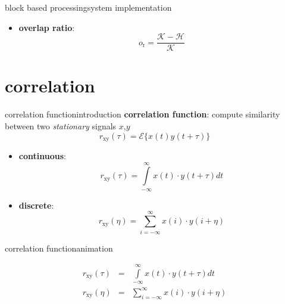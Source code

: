 \begin{frame}{block based processing}{system implementation}
{\begin{itemize}
\begin{eqnarray*}
                        i_{\mathrm{e}}(n)		&=& i_{\mathrm{s}}(n) + \mathcal{K} - 1
                    \end{eqnarray*}
                \item   \textbf{overlap ratio}:
                    \begin{equation*}
                        o_{\mathrm{r}}	= \frac {\mathcal{K}-\mathcal{H}}{\mathcal{K}}
                    \end{equation*}
            \end{itemize}}
            \vspace{50mm}
        \end{frame}	

    \section[correlation]{correlation}
        \begin{frame}{correlation function}{introduction}
            \textbf{correlation function}: compute similarity between two \textit{stationary} signals $x$,$y$
            \begin{equation}
                r_\mathrm{xy}(\tau)=\mathcal{E}\lbrace x(t)y(t+\tau)\rbrace  
            \end{equation}  
            
            \begin{itemize}
                \item<2->	\textbf{continuous}:
                    \begin{equation*}
                        r_\mathrm{xy}(\tau) = \int\limits_{-\infty}^{\infty}{x(t)\cdot y(t+\tau)dt}
                    \end{equation*}
                \item<2->	\textbf{discrete}:
                    \begin{equation*}
                        r_\mathrm{xy}(\eta) = \sum\limits_{i=-\infty}^{\infty}{x(i)\cdot y(i+\eta)}
                    \end{equation*}
            \end{itemize}
        \end{frame}	

        \begin{frame}{correlation function}{animation}
            \vspace{-5mm}
            \begin{footnotesize}
                    \begin{eqnarray*}
                        r_\mathrm{xy}(\tau) &=& \int\limits_{-\infty}^{\infty}{x(t)\cdot y(t+\tau)dt}\\
                        r_\mathrm{xy}(\eta) &=& \sum\limits_{i=-\infty}^{\infty}{x(i)\cdot y(i+\eta)}
                    \end{eqnarray*}
            \end{footnotesize}
        \end{frame}

